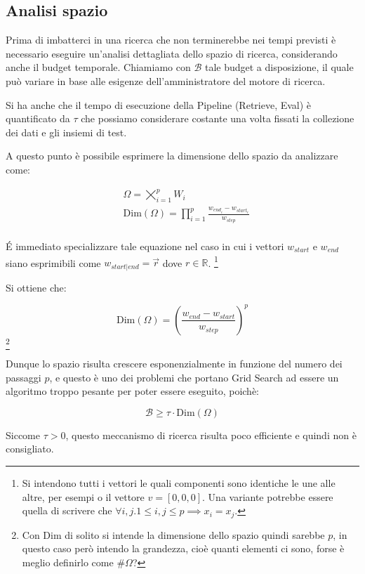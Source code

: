 \subsection{Analisi spazio}

Prima di imbatterci in una ricerca che non terminerebbe nei tempi previsti è necessario
eseguire un'analisi dettagliata dello spazio di ricerca, considerando anche il budget temporale.
Chiamiamo con $\mathcal{B}$ tale budget a disposizione, il quale
può variare in base alle esigenze dell'amministratore
del motore di ricerca.

Si ha anche che il tempo di esecuzione della Pipeline (Retrieve, Eval) è quantificato
da $\tau$ che possiamo considerare costante una volta fissati la collezione dei dati e gli insiemi di test.

A questo punto è possibile esprimere la dimensione dello spazio da analizzare come:

\begin{align*}\label{eq:gsdim}
& \Omega = \bigtimes_{i=1}^{p} W_i \\
& \text{Dim}(\Omega) = \prod\limits_{i=1}^{p} \frac{w_{end_i} - w_{start_i}}{w_{step}} \\
\end{align*}

\'E immediato specializzare tale equazione nel caso in cui i vettori $w_{start}$ e $w_{end}$
siano esprimibili come $w_{start|end} = \vec{r}$ dove $r \in \mathbb{R}$. \footnote{
	Si intendono tutti i vettori le quali componenti sono identiche le une alle altre, per esempi o il vettore $v = \left[0, 0, 0\right]$.
	Una variante potrebbe essere quella di scrivere che $\forall{i,j.1 \leq i,j \leq p} \implies x_i = x_j$.
}


Si ottiene che:

$$
\text{Dim}(\Omega) = \left(\frac{w_{end} - w_{start}}{w_{step}}\right)^{p}
$$\footnote{Con Dim di solito si intende la dimensione dello spazio quindi sarebbe $p$, in questo caso però intendo la grandezza, cioè quanti elementi ci sono, forse è meglio definirlo come $\#\Omega$?}

Dunque lo spazio risulta crescere esponenzialmente in funzione del numero
dei passaggi $p$, e questo è uno dei problemi che portano Grid Search ad essere
un algoritmo troppo pesante per poter essere eseguito, poichè:

$$
\mathcal{B} \geq \tau \cdot \text{Dim}(\Omega)
$$

Siccome $\tau > 0$, questo meccanismo di ricerca risulta poco efficiente e quindi non è consigliato.

